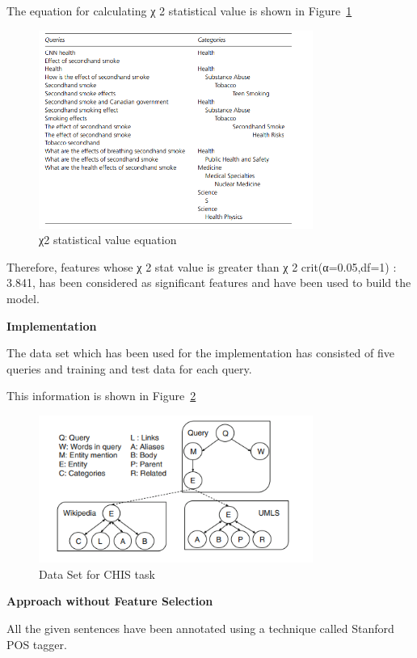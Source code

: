 \documentclass[]{article}
\begin{document}
The equation for calculating χ 2 statistical value is shown in Figure~\ref{fig25}

\begin{figure}[b!]
	\includegraphics[width=0.8\textwidth]{Capture25.png}
	\caption{χ2 statistical value equation \label{fig25}}
\end{figure} 

Therefore, features whose χ 2 stat value is greater than χ 2 crit(α=0.05,df=1) : 3.841, has been considered as significant features and have been used to build the model. 

\textbf{Implementation}

The data set which has been used for the implementation has consisted of five queries and training and test data  for each query. 

This information is shown in Figure~\ref{fig26}

\begin{figure}[t!]
	\includegraphics[width=0.8\textwidth]{Capture26.png}
	\caption{Data Set for CHIS task \label{fig26}}
\end{figure} 

\textbf{Approach without Feature Selection}

All the given sentences have been annotated using a technique called Stanford POS tagger. 
\end{document}
